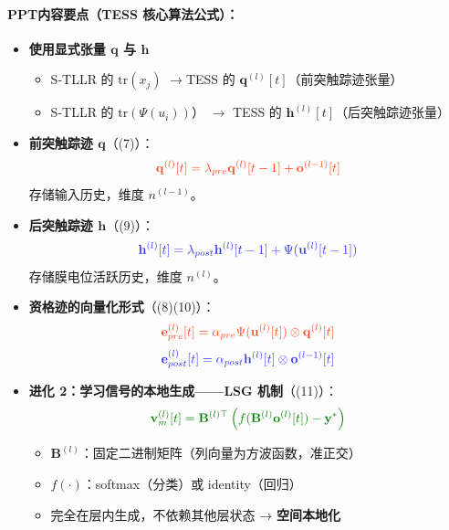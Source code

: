 \documentclass[journal,12pt,onecolumn]{IEEEtran}
\begin{document}
\paragraph{\textbf{PPT内容要点（TESS 核心算法公式）：}}
\begin{itemize}
    \item \textbf{使用显式张量 \(\mathbf{q}\) 与 \(\mathbf{h}\)}
    \begin{itemize}
        \item S-TLLR 的 \(\text{tr}(x_j)\) \(\rightarrow\)TESS 的 \(\mathbf{q}^{(l)}[t]\)（前突触踪迹张量）
        \item S-TLLR 的 \(\text{tr}(\Psi(u_i))\)） \(\rightarrow\) TESS 的 \(\mathbf{h}^{(l)}[t]\)（后突触踪迹张量）
    \end{itemize}
    
    \item \textbf{前突触踪迹 \(\mathbf{q}\)}（\cite{apolinario_tess_2025}(7)）：
    \[
    {\color{myred}\mathbf{q}^{(l)}[t] = \lambda_{pre}\mathbf{q}^{(l)}[t-1] + \mathbf{o}^{(l-1)}[t]}
    \]
    存储输入历史，维度 \(n^{(l-1)}\)。
    
    \item \textbf{后突触踪迹 \(\mathbf{h}\)}（\cite{apolinario_tess_2025}(9)）：
    \[
    {\color{myblue}\mathbf{h}^{(l)}[t] = \lambda_{post}\mathbf{h}^{(l)}[t-1] + \Psi(\mathbf{u}^{(l)}[t-1])}
    \]
    存储膜电位活跃历史，维度 \(n^{(l)}\)。
    
    \item \textbf{资格迹的向量化形式}（\cite{apolinario_tess_2025}(8)(10)）：
    \[
    {\color{myred}\mathbf{e}_{pre}^{(l)}[t] = \alpha_{pre}\Psi(\mathbf{u}^{(l)}[t]) \otimes \mathbf{q}^{(l)}[t]}
    \]
    \[
    {\color{myblue}\mathbf{e}_{post}^{(l)}[t] = \alpha_{post}\mathbf{h}^{(l)}[t] \otimes \mathbf{o}^{(l-1)}[t]}
    \]
    
    \item \textbf{进化 2：学习信号的本地生成——LSG 机制}（\cite{apolinario_tess_2025}(11)）：
    \[
    {\color{mygreen}\mathbf{v}_m^{(l)}[t] = \mathbf{B}^{(l)\top} \left( f(\mathbf{B}^{(l)} \mathbf{o}^{(l)}[t]) - \mathbf{y}^* \right)}
    \]
    \begin{itemize}
        \item \(\mathbf{B}^{(l)}\)：固定二进制矩阵（列向量为方波函数，准正交）
        \item \(f(\cdot)\)：softmax（分类）或 identity（回归）
        \item 完全在层内生成，不依赖其他层状态 → \textbf{空间本地化}
    \end{itemize}
    

\end{itemize}
\end{document}
